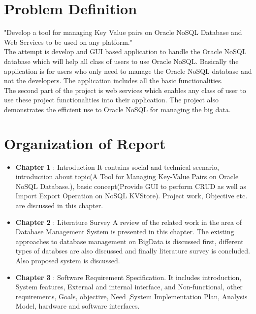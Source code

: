 \section{Problem Definition}
\hspace*{0.7in} "Develop a tool for managing Key Value pairs on Oracle NoSQL Database and Web Services to be used on any platform."
\\
\hspace*{0.7in}	The attempt is develop and GUI based application to handle the Oracle NoSQL database which will help all class of users to use Oracle NoSQL. Basically the application is for users who only need to manage the Oracle NoSQL database and not the developers. The application includes all the basic functionalities.
\\
\hspace*{0.7in}	The second part of the project is web services which enables any class of user to use these project functionalities into their application. The project also demonstrates the efficient use to Oracle NoSQL for managing the big data.

\section{Organization of Report}
\begin{itemize}
  \item \textbf{Chapter 1} : Introduction It contains social and technical scenario, introduction  about topic(A Tool for Managing Key-Value Pairs on Oracle NoSQL Database.), basic concept(Provide GUI to perform CRUD as well as Import Export Operation on NoSQL KVStore). Project work, Objective etc. are discussed in this chapter.
\end{itemize}

\begin{itemize}
  \item \textbf{Chapter 2} : Literature Survey A review of the related work in the area of Database Management System is presented in this chapter. The existing approaches to database management on BigData is discussed first, different types of databses are also discussed and finally literature survey is concluded. Also proposed system is discussed.
\end{itemize}

\begin{itemize}
  \item \textbf{Chapter 3} : Software Requirement Specification. It includes introduction, System features, External and internal interface, and Non-functional, other requirements, Goals, objective, Need ,System Implementation Plan, Analysis Model, hardware and software interfaces.
\end{itemize}

